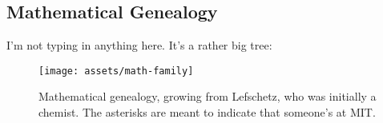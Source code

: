 \subsection{Mathematical Genealogy}
I'm not typing in anything here. It's a rather big tree:
\begin{figure}[H]
\centering
\texttt{[image: assets/math-family]}
\caption{Mathematical genealogy, growing from Lefschetz, who was initially a chemist. The asterisks are meant to indicate that someone's at MIT.}
\end{figure}
